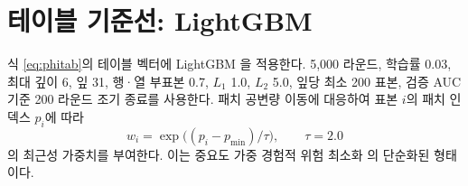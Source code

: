 
\section{테이블 기준선: LightGBM}
\label{sec:model-lgbm}

식 \eqref{eq:phitab}의 테이블 벡터에 LightGBM \cite{ke2017lightgbm}을 적용한다. 5{,}000 라운드, 학습률 0.03, 최대 깊이 6, 잎 31, 행·열 부표본 0.7, $L_1$ 1.0, $L_2$ 5.0, 잎당 최소 200 표본, 검증 AUC 기준 200 라운드 조기 종료를 사용한다. 패치 공변량 이동에 대응하여 표본 $i$의 패치 인덱스 $p_i$에 따라
\begin{equation}
  w_i = \exp\!\big((p_i - p_{\min})/\tau\big), \qquad \tau = 2.0
\end{equation}
의 최근성 가중치를 부여한다. 이는 중요도 가중 경험적 위험 최소화 \cite{shimodaira2000improving}의 단순화된 형태이다.
